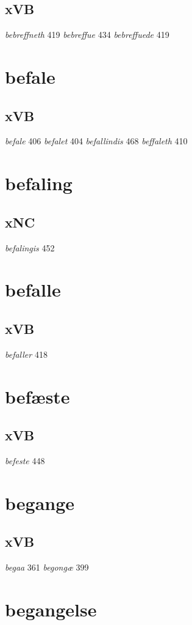 \documentclass[a4paper,twocolumn]{article}
\begin{document}
\subsection{xVB}
\label{sec:orgcc741e7}
\emph{bebreffneth} 419 \emph{bebreffue} 434 \emph{bebreffuede} 419 
\section{befale}
\label{sec:orgac05e4c}
\subsection{xVB}
\label{sec:org9cbb8a3}
\emph{befale} 406 \emph{befalet} 404 \emph{befallindis} 468 \emph{beffaleth} 410 
\section{befaling}
\label{sec:org24a3ed2}
\subsection{xNC}
\label{sec:org17859af}
\emph{befalingis} 452 
\section{befalle}
\label{sec:orgd7b56ca}
\subsection{xVB}
\label{sec:orgb56c49d}
\emph{befaller} 418 
\section{befæste}
\label{sec:org4242095}
\subsection{xVB}
\label{sec:orgd94e487}
\emph{befeste} 448 
\section{begange}
\label{sec:orgb366473}
\subsection{xVB}
\label{sec:org198afa8}
\emph{begaa} 361 \emph{begongæ} 399 
\section{begangelse}
\label{sec:org8f44c19}
\end{document}

